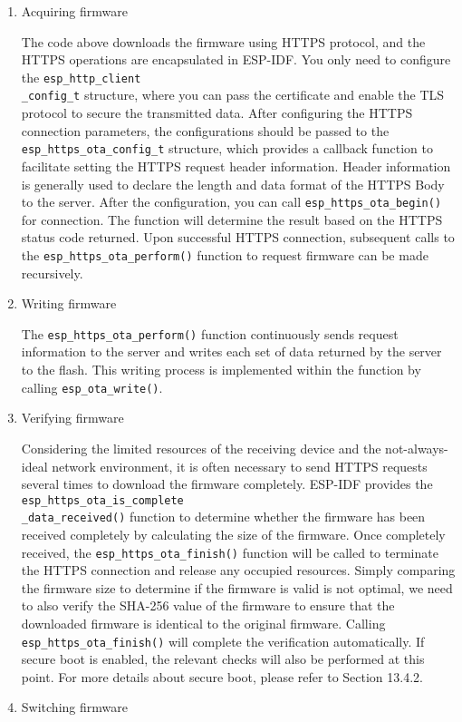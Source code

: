 \documentclass[a4paper,12pt]{book}
\begin{document}
\vspace{6pt}
\begin{enumerate}[label=(\arabic*)]
    \item Acquiring firmware
    
    The code above downloads the firmware using HTTPS protocol, and the HTTPS operations are encapsulated in ESP-IDF. You only need to configure the \verb|esp_http_client|\\ \verb|_config_t| structure, where you can pass the certificate and enable the TLS protocol to secure the transmitted data. After configuring the HTTPS connection parameters, the configurations should be passed to the \verb|esp_https_ota_config_t| structure, which provides a callback function to facilitate setting the HTTPS request header information. Header information is generally used to declare the length and data format of the HTTPS Body to the server. After the configuration, you can call \verb|esp_https_ota_begin()| for connection. The function will determine the result based on the HTTPS status code returned. Upon successful HTTPS connection, subsequent calls to the \verb|esp_https_ota_perform()| function to request firmware can be made recursively.
    \item Writing firmware
    
    The \verb|esp_https_ota_perform()| function continuously sends request information to the server and writes each set of data returned by the server to the flash. This writing process is implemented within the function by calling \verb|esp_ota_write()|.
    \item Verifying firmware
    
    Considering the limited resources of the receiving device and the not-always-ideal network environment, it is often necessary to send HTTPS requests several times to download the firmware completely. ESP-IDF provides the \verb|esp_https_ota_is_complete|\\ \verb|_data_received()| function to determine whether the firmware has been received completely by calculating the size of the firmware. Once completely received, the \verb|esp_https_ota_finish()| function will be called to terminate the HTTPS connection and release any occupied resources. Simply comparing the firmware size to determine if the firmware is valid is not optimal, we need to also verify the SHA-256 value of the firmware to ensure that the downloaded firmware is identical to the original firmware. Calling \verb|esp_https_ota_finish()| will complete the verification automatically. If secure boot is enabled, the relevant checks will also be performed at this point. For more details about secure boot, please refer to Section 13.4.2.
    \item Switching firmware
    

\end{enumerate}
\end{document}
